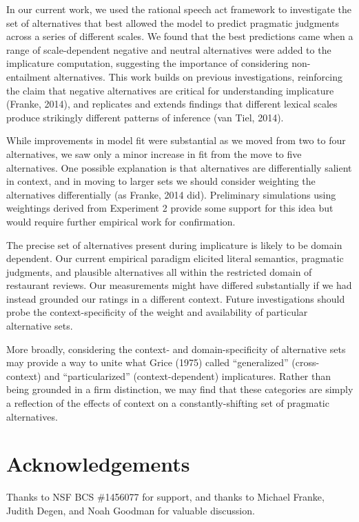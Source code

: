 \documentclass[10pt, letterpaper]{article}
\begin{document}
In our current work, we used the rational speech act framework to
investigate the set of alternatives that best allowed the model to
predict pragmatic judgments across a series of different scales. We
found that the best predictions came when a range of scale-dependent
negative and neutral alternatives were added to the implicature
computation, suggesting the importance of considering non-entailment
alternatives. This work builds on previous investigations, reinforcing
the claim that negative alternatives are critical for understanding
implicature (Franke, 2014), and replicates and extends findings that
different lexical scales produce strikingly different patterns of
inference ({van Tiel}, 2014).

While improvements in model fit were substantial as we moved from two to
four alternatives, we saw only a minor increase in fit from the move to
five alternatives. One possible explanation is that alternatives are
differentially salient in context, and in moving to larger sets we
should consider weighting the alternatives differentially (as Franke,
2014 did). Preliminary simulations using weightings derived from
Experiment 2 provide some support for this idea but would require
further empirical work for confirmation.

The precise set of alternatives present during implicature is likely to
be domain dependent. Our current empirical paradigm elicited literal
semantics, pragmatic judgments, and plausible alternatives all within
the restricted domain of restaurant reviews. Our measurements might have
differed substantially if we had instead grounded our ratings in a
different context. Future investigations should probe the
context-specificity of the weight and availability of particular
alternative sets.

More broadly, considering the context- and domain-specificity of
alternative sets may provide a way to unite what Grice (1975) called
``generalized'' (cross-context) and ``particularized''
(context-dependent) implicatures. Rather than being grounded in a firm
distinction, we may find that these categories are simply a reflection
of the effects of context on a constantly-shifting set of pragmatic
alternatives.

\section{Acknowledgements}\label{acknowledgements}

Thanks to NSF BCS \#1456077 for support, and thanks to Michael Franke,
Judith Degen, and Noah Goodman for valuable discussion.
\end{document}
